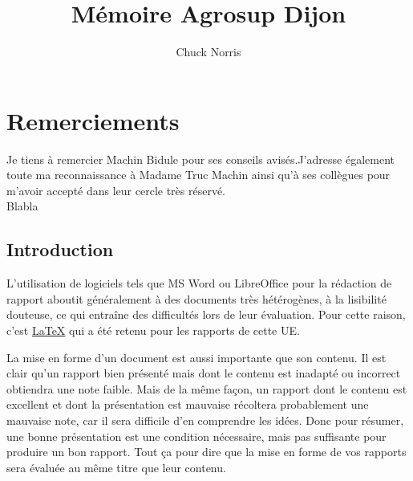 \documentclass{ASD}
\title{Mémoire Agrosup Dijon}
\author{Chuck Norris}
\begin{document}
\maketitle


\chapter*{Remerciements}
\thispagestyle{empty}
Je tiens à remercier Machin Bidule  pour ses conseils avisés.J'adresse également toute ma reconnaissance à Madame Truc Machin ainsi qu'à ses collègues pour m'avoir accepté dans leur cercle très réservé. \\

Blabla

\MyToc

\listoffigures  %
\newpage        %
\listoftables   %
\newpage        %
\sloppy          


\section{Introduction}

L'utilisation de logiciels tels que MS Word ou LibreOffice pour la rédaction de rapport aboutit généralement à des documents très hétérogènes, à la lisibilité douteuse, ce qui entraîne des difficultés lors de leur évaluation. Pour cette raison, c'est \href{http://fr.wikipedia.org/wiki/LaTeX}{\LaTeX} \cite{LaTeXProject2010, Wikipedia2011a} qui a été retenu pour les rapports de cette UE.

La mise en forme d'un document est aussi importante que son contenu. Il est clair qu'un rapport bien présenté mais dont le contenu est inadapté ou incorrect obtiendra une note faible. Mais de la même façon, un rapport dont le contenu est excellent et dont la présentation est mauvaise récoltera probablement une mauvaise note, car il sera difficile d'en comprendre les idées. Donc pour résumer, une bonne présentation est une condition nécessaire, mais pas suffisante pour produire un bon rapport. Tout ça pour dire que la mise en forme de vos rapports sera évaluée au même titre que leur contenu.
	
\end{document}
